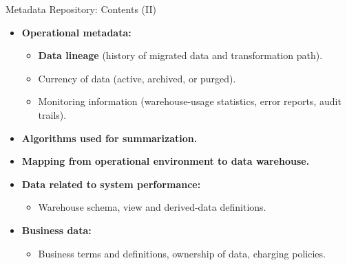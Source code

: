 \begin{frame}{Metadata Repository: Contents (II)}
  \begin{itemize}
  \item \textbf{{\color{airforceblue}Operational} metadata:}
    \begin{itemize}
    \item \textbf{\color{airforceblue}Data lineage} (history of migrated data and transformation path).
    \item Currency of data (active, archived, or purged).
    \item Monitoring information (warehouse-usage statistics, error reports, audit trails).
    \end{itemize}
  \item \textbf{{\color{airforceblue}Algorithms} used for summarization.}
  \item \textbf{{\color{airforceblue}Mapping} from operational environment to data warehouse.}
  \item \textbf{Data related to system performance:}
    \begin{itemize}
    \item Warehouse schema, view and derived-data definitions.
    \end{itemize}
  \item \textbf{Business data:}
    \begin{itemize}
    \item Business terms and definitions, ownership of data, charging policies.
    \end{itemize}
  \end{itemize}
\end{frame}

